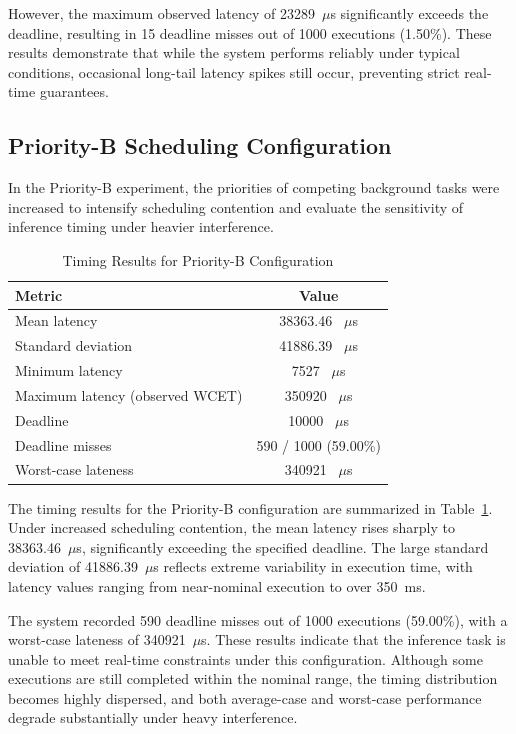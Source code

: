 \documentclass[conference]{IEEEtran}
\begin{document}
However, the maximum observed latency of 23289~$\mu$s significantly exceeds the deadline, resulting in 15 deadline misses out of 1000 executions (1.50\%). These results demonstrate that while the system performs reliably under typical conditions, occasional long-tail latency spikes still occur, preventing strict real-time guarantees.

\subsection{Priority-B Scheduling Configuration}

In the Priority-B experiment, the priorities of competing background tasks were increased to intensify scheduling contention and evaluate the sensitivity of inference timing under heavier interference.

\begin{table}[h]
\centering
\caption{Timing Results for Priority-B Configuration}
\label{tab:priority_b}
\begin{tabular}{l c}
\hline
\textbf{Metric} & \textbf{Value} \\
\hline
Mean latency & 38363.46 ~$\mu$s \\
Standard deviation & 41886.39 ~$\mu$s \\
Minimum latency & 7527 ~$\mu$s \\
Maximum latency (observed WCET) & 350920 ~$\mu$s \\
Deadline & 10000 ~$\mu$s \\
Deadline misses & 590 / 1000 (59.00\%) \\
Worst-case lateness & 340921 ~$\mu$s \\
\hline
\end{tabular}
\end{table}

The timing results for the Priority-B configuration are summarized in Table~\ref{tab:priority_b}. Under increased scheduling contention, the mean latency rises sharply to 38363.46~$\mu$s, significantly exceeding the specified deadline. The large standard deviation of 41886.39~$\mu$s reflects extreme variability in execution time, with latency values ranging from near-nominal execution to over 350~ms.

The system recorded 590 deadline misses out of 1000 executions (59.00\%), with a worst-case lateness of 340921~$\mu$s. These results indicate that the inference task is unable to meet real-time constraints under this configuration. Although some executions are still completed within the nominal range, the timing distribution becomes highly dispersed, and both average-case and worst-case performance degrade substantially under heavy interference.
\end{document}
